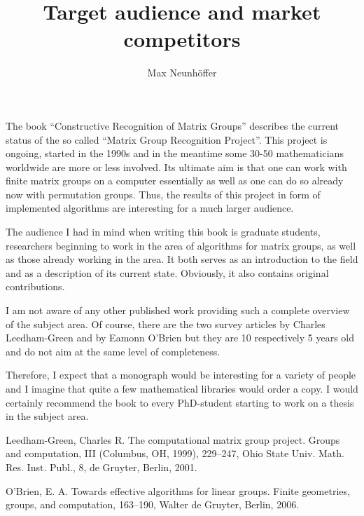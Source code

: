 \documentclass[11pt]{article}
\begin{document}
\title{Target audience and market competitors}
\author{Max Neunh\"offer}
\maketitle

The book ``Constructive Recognition of Matrix Groups'' describes the
current status of the so called ``Matrix Group Recognition Project''.
This project is ongoing, started in the 1990s and in the meantime
some 30-50 mathematicians worldwide are more or less involved.
Its ultimate aim is that one can work with finite matrix groups
on a computer essentially as well as one can do so already now with
permutation groups. Thus, the results of this project in form of
implemented algorithms are interesting for a much larger audience.

The audience I had in mind when writing this book is graduate
students, researchers beginning to work in the area of
algorithms for matrix groups, as well as those already working
in the area. It both serves as an introduction to the field and
as a description of its current state. Obviously, it also contains
original contributions.

I am not aware of any other published work providing such a complete
overview of the subject area. Of course, there are the two survey
articles \cite{CLG} by Charles Leedham-Green and \cite{EOB} 
by Eamonn O'Brien but they
are 10 respectively 5 years old and do not aim at the same level of
completeness.

Therefore, I expect that a monograph would be interesting for a
variety of people and I imagine that quite a few mathematical
libraries would order a copy. I would certainly recommend the book
to every PhD-student starting to work on a thesis in the subject area.

\begin{thebibliography}{[1]}
 Leedham-Green, Charles R.  \newblock
 The computational matrix group project. \newblock
 Groups and computation, III (Columbus, OH, 1999), 
 229--247, Ohio State Univ. Math. Res. Inst. Publ., 8, de Gruyter,
Berlin,  2001. 
                
 O'Brien, E. A. \newblock
 Towards effective algorithms for linear groups. \newblock
 Finite geometries, groups, and computation, 
 163--190, Walter de Gruyter, Berlin,  2006. 

\end{thebibliography}
\end{document}
